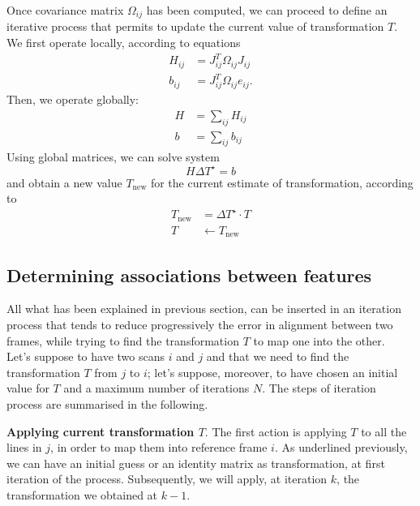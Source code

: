 \documentclass[a4paper, onecolumn]{report}
\begin{document}
Once covariance matrix $\Omega_{ij}$ has been computed, we can proceed to define an iterative process that permits to update the current value of transformation $T$. We first operate locally, according to equations
\begin{equation}
	\begin{aligned}
		H_{ij} &= J_{ij}^T\Omega_{ij}J_{ij} \\
		b_{ij} &= J_{ij}^T\Omega_{ij}e_{ij}.
	\end{aligned}
\end{equation}
Then, we operate globally:
\begin{equation}
	\begin{aligned}
		H &= \sum_{ij} H_{ij} \\
		b &= \sum_{ij} b_{ij}
	\end{aligned}
\end{equation}
Using global matrices, we can solve system 
\begin{equation}
	H\Delta T^\star = b
\end{equation}
and obtain a new value $T_{\mbox{new}}$ for the current estimate of transformation, according to
\begin{equation}
	\begin{aligned}
		T_{\mbox{new}} &= \Delta T^\star \cdot T \\
		T  &\leftarrow  T_{\mbox{new}} 
	\end{aligned}
\end{equation}

\subsection{Determining associations between features}
All what has been explained in previous section, can be inserted in an iteration process that tends to reduce progressively the error in alignment between two frames, while trying to find the transformation $T$ to map one into the other. \\
Let's suppose to have two scans $i$ and $j$ and that we need to find the transformation $T$ from $j$ to $i$; let's suppose, moreover, to have chosen an initial value for $T$ and a maximum number of iterations $N$. The steps of iteration process are summarised in the following.

\textbf{Applying current transformation $T$}. The first action is applying $T$ to all the lines in $j$, in order to map them into reference frame $i$. As underlined previously, we can have an initial guess or an identity matrix as transformation, at first iteration of the process. Subsequently, we will apply, at iteration $k$, the transformation we obtained at $k-1$.
\end{document}
